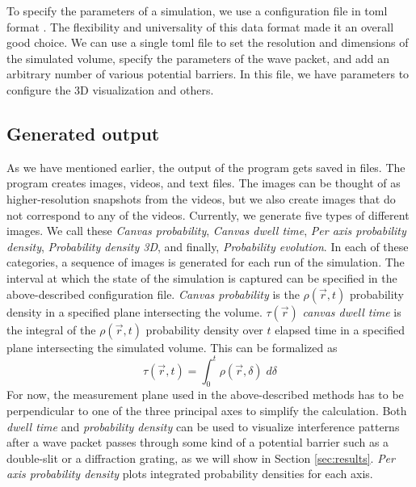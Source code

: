 To specify the parameters of a simulation, we use a configuration file in \acrfull{toml} format \cite{toml}.
The flexibility and universality of this data format made it an overall good choice.
We can use a single \acrshort{toml} file to set the resolution and dimensions of the simulated volume, specify the parameters of the wave packet, and add an arbitrary number of various potential barriers.
In this file, we have parameters to configure the 3D visualization and others.

\subsection{Generated output}

As we have mentioned earlier, the output of the program gets saved in files.
The program creates images, videos, and text files.
The images can be thought of as higher-resolution snapshots from the videos, but we also create images that do not correspond to any of the videos.
Currently, we generate five types of different images.
We call these \textit{Canvas probability}, \textit{Canvas dwell time}, \textit{Per axis probability density}, \textit{Probability density 3D}, and finally, \textit{Probability evolution}.
In each of these categories, a sequence of images is generated for each run of the simulation.
The interval at which the state of the simulation is captured can be specified in the above-described configuration file.
\textit{Canvas probability} is the $\rho(\vec{r}, t)$ probability density in a specified plane intersecting the volume.
$\tau (\vec{r})$ \textit{canvas dwell time} is the integral of the $\rho(\vec{r}, t)$ probability density over $t$ elapsed time in a specified plane intersecting the simulated volume.
This can be formalized as
\begin{equation}
	\tau (\vec{r}, t) = \int_0^t \rho(\vec{r}, \delta)\; d\delta
	\label{eq:dwell_time}
\end{equation}
For now, the measurement plane used in the above-described methods has to be perpendicular to one of the three principal axes to simplify the calculation.
Both \textit{dwell time} and \textit{probability density} can be used to visualize interference patterns after a wave packet passes through some kind of a potential barrier such as a double-slit or a diffraction grating, as we will show in Section \ref{sec:results}.
\textit{Per axis probability density} plots integrated probability densities for each axis.
